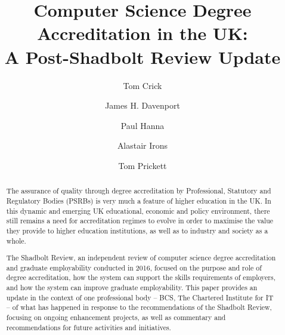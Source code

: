 \documentclass[sigconf]{acmart}
\begin{document}
\title[UK Computer Science Degree Accreditation,
Post-Shadbolt]{Computer Science Degree Accreditation in the UK:\\A
Post-Shadbolt Review Update}


\author{Tom Crick}

\author{James H. Davenport}

\author{Paul Hanna}

\author{Alastair Irons}

\author{Tom Prickett}


\renewcommand{\shortauthors}{Crick, Davenport, Hanna, Irons, and Prickett}

\begin{abstract}
The assurance of quality through degree accreditation by Professional,
Statutory and Regulatory Bodies (PSRBs) is very much a feature of
higher education in the UK.  In this dynamic and emerging UK
educational, economic and policy environment, there still remains a
need for accreditation regimes to evolve in order to maximise the
value they provide to higher education institutions, as well as to
industry and society as a whole.

The Shadbolt Review, an independent review of computer science degree
accreditation and graduate employability conducted in 2016, focused on
the purpose and role of degree accreditation, how the system can
support the skills requirements of employers, and how the system can
improve graduate employability. This paper provides an update in the
context of one professional body -- BCS, The Chartered Institute for
IT -- of what has happened in response to the recommendations of the
Shadbolt Review, focusing on ongoing enhancement projects, as well as
commentary and recommendations for future activities and initiatives.
\end{abstract}
\end{document}
